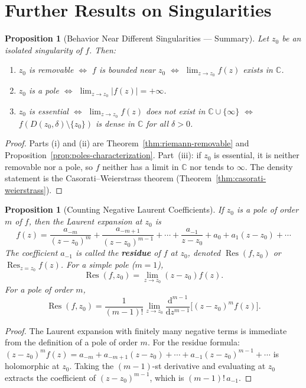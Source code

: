 \documentclass[12pt,a4paper,openany]{book}
\theoremstyle{definition}
\theoremstyle{plain}
\newtheorem{proposition}[definition]{Proposition}
\theoremstyle{remark}
\newcommand{\C}{\mathbb{C}}
\DeclareMathOperator{\Res}{Res}
\newcommand{\dd}{\mathrm{d}}
\newcommand{\abs}[1]{\left|#1\right|}
\begin{document}
\section{Further Results on Singularities}
\label{sec:further-singularities}

\begin{proposition}[Behavior Near Different Singularities --- Summary]\label{prop:singularity-summary}
Let $z_0$ be an isolated singularity of $f$. Then:
\begin{enumerate}[label=(\roman*)]
  \item $z_0$ is removable $\iff$ $f$ is bounded near $z_0$ $\iff$ $\lim_{z\to z_0}f(z)$ exists in $\C$.
  \item $z_0$ is a pole $\iff$ $\lim_{z\to z_0}\abs{f(z)}=+\infty$.
  \item $z_0$ is essential $\iff$ $\lim_{z\to z_0}f(z)$ does not exist in $\C\cup\{\infty\}$
    $\iff$ $f(D(z_0,\delta)\setminus\{z_0\})$ is dense in $\C$ for all $\delta>0$.
\end{enumerate}
\end{proposition}

\begin{proof}
Parts (i) and (ii) are Theorem~\ref{thm:riemann-removable} and
Proposition~\ref{prop:poles-characterization}. Part~(iii): if $z_0$ is essential,
it is neither removable nor a pole, so $f$ neither has a limit in $\C$ nor tends
to $\infty$. The density statement is the Casorati--Weierstrass theorem
(Theorem~\ref{thm:casorati-weierstrass}).
\end{proof}

\begin{proposition}[Counting Negative Laurent Coefficients]\label{prop:pole-order-residue}
If $z_0$ is a pole of order $m$ of $f$, then the Laurent expansion at $z_0$ is
\[
  f(z) = \frac{a_{-m}}{(z-z_0)^m} + \frac{a_{-m+1}}{(z-z_0)^{m-1}}
  + \cdots + \frac{a_{-1}}{z-z_0} + a_0 + a_1(z-z_0) + \cdots
\]
The coefficient $a_{-1}$ is called the \textbf{residue} of $f$ at $z_0$, denoted
$\Res(f,z_0)$ or $\Res_{z=z_0}f(z)$. For a simple pole ($m=1$),
\[
  \Res(f,z_0) = \lim_{z\to z_0}(z-z_0)f(z).
\]
For a pole of order $m$,
\[
  \Res(f,z_0) = \frac{1}{(m-1)!}\lim_{z\to z_0}\frac{\dd^{m-1}}{\dd z^{m-1}}
    \bigl[(z-z_0)^m f(z)\bigr].
\]
\end{proposition}

\begin{proof}
The Laurent expansion with finitely many negative terms is immediate from the
definition of a pole of order $m$. For the residue formula: $(z-z_0)^m f(z)=
a_{-m}+a_{-m+1}(z-z_0)+\cdots+a_{-1}(z-z_0)^{m-1}+\cdots$ is holomorphic at
$z_0$. Taking the $(m-1)$-st derivative and evaluating at $z_0$ extracts the
coefficient of $(z-z_0)^{m-1}$, which is $(m-1)!\,a_{-1}$.
\end{proof}
\end{document}

